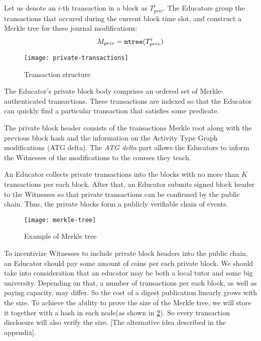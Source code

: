 Let us denote an $i$-th transaction in a block as $T_{priv}^i$. The Educators group the transactions that occured during the current block time slot, and construct a Merkle tree \cite{merkle1989certified} for these journal modifications:
\begin{equation}
M_{priv} = \mathtt{mtree}(T_{priv}^i)
\end{equation}

\begin{figure}[ht]
\centering
\texttt{[image: private-transactions]}
\caption{Transaction structure}
\label{fig:private-transactions}
\end{figure}



The Educator's private block body comprises an ordered set of Merkle-authenticated transactions. These transactions are indexed so that the Educator can quickly find a particular transaction that satisfies some predicate.

The private block header consists of the transactions Merkle root along with the
previous block hash and the information on the Activity Type Graph modifications
(ATG delta). The \textit{ATG delta} part allows the Educators to inform the
Witnesses of the modifications to the courses they teach.

An Educator collects private transactions into the blocks with no more than $K$ transactions per each block. After that, an Educator submits signed block header to the Witnesses so that private transactions can be confirmed by the public chain. Thus, the private blocks form a publicly verifiable chain of events.


\begin{figure}[ht]
\centering
\texttt{[image: merkle-tree]}
\caption{Example of Merkle tree}
\label{fig:merkle-tree}
\end{figure}



To incentivize Witnesses to include private block headers into the public chain, an Educator should pay some amount of coins per each private block. We should take into consideration that an educator may be both a local tutor and some big university. Depending on that, a number of transactions per each block, as well as paying capacity, may differ. So the cost of a digest publication linearly grows with the size. To achieve the ability to prove the size of the Merkle tree, we will store it together with a hash in each node(as shown in \ref{fig:merkle-tree}). So every transaction disclosure will also verify the size. [The alternative idea described in the appendix].


